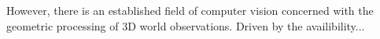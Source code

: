 However, there is an established field of computer vision concerned with the geometric processing 
of 3D world observations. Driven by the availibility...




